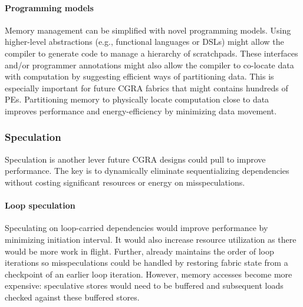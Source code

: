 \paragraph{Programming models}
Memory management can be simplified with novel programming models.
% 
Using higher-level abstractions (e.g., functional languages or DSLs) might allow the compiler to generate code to manage a hierarchy of scratchpads.
%
These interfaces and/or programmer annotations might also allow the compiler to co-locate data with computation by suggesting efficient ways of partitioning data.
% 
This is especially important for future CGRA fabrics that might contains hundreds of PEs.
% 
Partitioning memory to physically locate computation close to data improves performance and energy-efficiency by minimizing data movement.

\subsubsection{Speculation}
Speculation is another lever future CGRA designs could pull to improve performance.
%
The key is to dynamically eliminate sequentializing dependencies without costing significant resources or energy on misspeculations.

\paragraph{Loop speculation}
Speculating on loop-carried dependencies would improve performance by minimizing initiation interval.
% 
It would also increase resource utilization as there would be more work in flight.
% 
Further, \riptide already maintains the order of loop iterations so misspeculations could be handled by restoring fabric state from a checkpoint of an earlier loop iteration.
% 
However, memory accesses become more expensive: 
speculative stores would need to be buffered and subsequent loads checked against these buffered stores.


